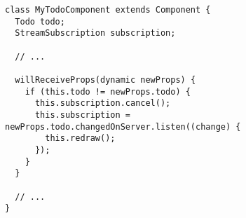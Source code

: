       \begin{verbatim}
class MyTodoComponent extends Component {
  Todo todo;
  StreamSubscription subscription;

  // ...

  willReceiveProps(dynamic newProps) {
    if (this.todo != newProps.todo) {
      this.subscription.cancel();
      this.subscription = newProps.todo.changedOnServer.listen((change) {
        this.redraw();
      });
    }
  }

  // ...
}
      \end{verbatim}

